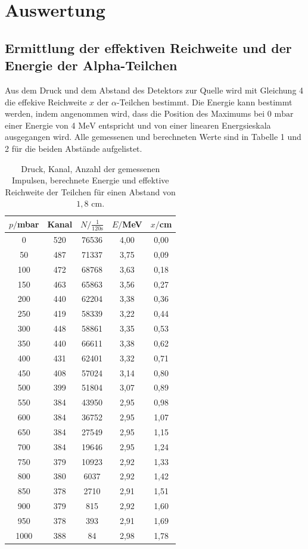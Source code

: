 \section{Auswertung}
\label{sec:Auswertung}

\subsection{Ermittlung der effektiven Reichweite und der Energie der Alpha-Teilchen}
Aus dem Druck und dem Abstand des Detektors zur Quelle wird mit Gleichung 4 die effekive Reichweite $x$ der $\alpha$-Teilchen bestimmt. 
Die Energie kann bestimmt werden, indem angenommen wird, dass die Position des Maximums bei $0$ $\si{\milli\bar}$ einer Energie von 4 $\si{\MeV}$ entspricht und von einer linearen Energsieskala ausgegangen wird.
Alle gemessenen und berechneten Werte sind in Tabelle 1 und 2 für die beiden Abstände aufgelistet.


\begin{table}[H]
  \centering
  \caption{Druck, Kanal, Anzahl der gemessenen Impulsen, berechnete Energie und effektive Reichweite der Teilchen für einen Abstand von $1,8$ $\si{\cm}$.}
  \label{tab:Parameter}
  \begin{tabular}{c c c c c}
    \toprule
    $p/$mbar& Kanal & $N/\frac{1}{120\si{\second}}$ & $E/$MeV & $x/$cm \\
    \bottomrule
    0 & 520 & 76536 & 4,00 & 0,00 \\
    50 & 487 & 71337 & 3,75 & 0,09 \\
    100 & 472 & 68768 & 3,63 & 0,18 \\
    150 & 463 & 65863 & 3,56 & 0,27 \\
    200 & 440 & 62204 & 3,38 & 0,36 \\
    250 & 419 & 58339 & 3,22 & 0,44 \\
    300 & 448 & 58861 & 3,35 & 0,53 \\
    350 & 440 & 66611 & 3,38 & 0,62 \\
    400 & 431 & 62401 & 3,32 & 0,71 \\
    450 & 408 & 57024 & 3,14 & 0,80 \\
    500 & 399 & 51804 & 3,07 & 0,89 \\
    550 & 384 & 43950 & 2,95 & 0,98 \\
    600 & 384 & 36752 & 2,95 & 1,07 \\
    650 & 384 & 27549 & 2,95 & 1,15 \\
    700 & 384 & 19646 & 2,95 & 1,24 \\
    750 & 379 & 10923 & 2,92 & 1,33 \\
    800 & 380 & 6037 & 2,92 & 1,42 \\
    850 & 378 & 2710 & 2,91 & 1,51 \\
    900 & 379 & 815 & 2,92 & 1,60 \\
    950 & 378 & 393 & 2,91 & 1,69 \\
    1000 & 388 & 84 & 2,98 & 1,78 \\
 
     \bottomrule
  \end{tabular}
\end{table}

